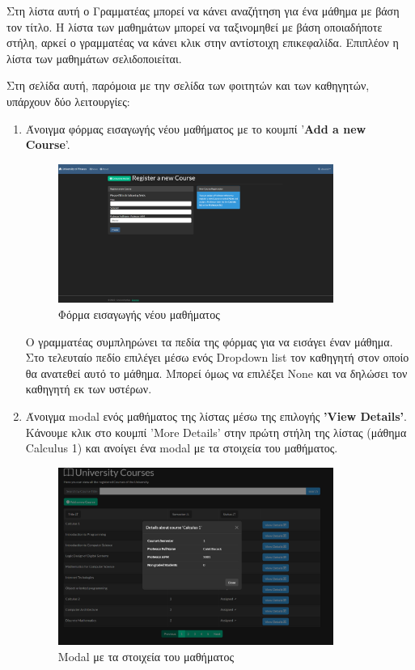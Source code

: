 \documentclass[12pt]{article}
\begin{document}
Στη λίστα αυτή ο Γραμματέας μπορεί να κάνει αναζήτηση για ένα μάθημα με βάση τον τίτλο. Η λίστα των μαθημάτων μπορεί να ταξινομηθεί με βάση οποιαδήποτε στήλη, αρκεί ο γραμματέας να κάνει κλικ στην αντίστοιχη επικεφαλίδα. Επιπλέον η λίστα των μαθημάτων σελιδοποιείται.


Στη σελίδα αυτή, παρόμοια με την σελίδα των φοιτητών και των καθηγητών, υπάρχουν δύο λειτουργίες:

\begin{enumerate}
	\item Άνοιγμα φόρμας εισαγωγής νέου μαθήματος με το κουμπί '\textbf{Add a new Course}'.\\
	
	\begin{figure}[H]
		\centering
		\includegraphics[width=0.85\textwidth]{newcor.png}
		\caption{Φόρμα εισαγωγής νέου μαθήματος}
		\label{fig:emptyView}
	\end{figure}
	
	Ο γραμματέας συμπληρώνει τα πεδία της φόρμας για να εισάγει έναν μάθημα. Στο τελευταίο πεδίο επιλέγει μέσω ενός Dropdown list τον καθηγητή στον οποίο θα ανατεθεί αυτό το μάθημα. Μπορεί όμως να επιλέξει None και να δηλώσει τον καθηγητή εκ των υστέρων.
	
	\item Άνοιγμα modal ενός μαθήματος της λίστας μέσω της επιλογής \textbf{'View Details'}.\\
	Κάνουμε κλικ στο κουμπί 'More Details' στην πρώτη στήλη της λίστας (μάθημα 	Calculus 1) και ανοίγει ένα modal με τα στοιχεία του μαθήματος.
	
	\begin{figure}[H]
		\centering
		\includegraphics[width=0.85\textwidth]{calc1.png}
		\caption{Modal με τα στοιχεία του μαθήματος}
		\label{fig:emptyView}
	\end{figure}
	

\end{enumerate}
\end{document}
